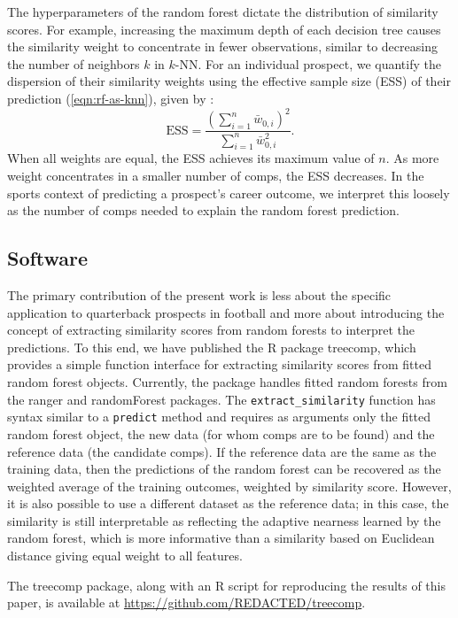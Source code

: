 \documentclass[Review, sageh, times, doublespace]{sagej}
\begin{document}
The hyperparameters of the random forest dictate the distribution of similarity scores. For example, increasing the maximum depth of each decision tree causes the similarity weight to concentrate in fewer observations, similar to decreasing the number of neighbors $k$ in $k$-NN. For an individual prospect, we quantify the dispersion of their similarity weights using the effective sample size (ESS) of their prediction (\ref{eqn:rf-as-knn}), given by \citep{mccaffrey_propensity_2004}:
$$
  \text{ESS}=\frac{\left(\sum_{i=1}^n\bar w_{0,i}\right)^2}{\sum_{i=1}^{n}\bar w_{0,i}^2}.
$$
When all weights are equal, the ESS achieves its maximum value of $n$. As more weight concentrates in a smaller number of comps, the ESS decreases. In the sports context of predicting a prospect's career outcome, we interpret this loosely as the number of comps needed to explain the random forest prediction.

\subsection{Software}
\label{sec:software}

The primary contribution of the present work is less about the specific application to quarterback prospects in football and more about introducing the concept of extracting similarity scores from random forests to interpret the predictions. To this end, we have published the R package treecomp, which provides a simple function interface for extracting similarity scores from fitted random forest objects. Currently, the package handles fitted random forests from the ranger and randomForest packages. The \texttt{extract\_similarity} function has syntax similar to a \texttt{predict} method and requires as arguments only the fitted random forest object, the new data (for whom comps are to be found) and the reference data (the candidate comps). If the reference data are the same as the training data, then the predictions of the random forest can be recovered as the weighted average of the training outcomes, weighted by similarity score. However, it is also possible to use a different dataset as the reference data; in this case, the similarity is still interpretable as reflecting the adaptive nearness learned by the random forest, which is more informative than a similarity based on Euclidean distance giving equal weight to all features.

The treecomp package, along with an R script for reproducing the results of this paper, is available at \url{https://github.com/REDACTED/treecomp}.
\end{document}
